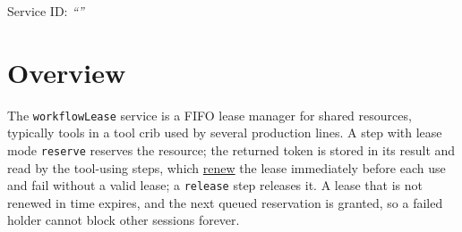 \documentclass[a4paper]{arrowhead}
\newcommand{\oref}[1]{{\textcolor{ArrowheadBlue}{\hyperref[sec:operations:#1]{#1}}}}
\begin{document}
\ArrowheadSetup

\begin{center}
  \vspace*{1cm}
  \huge{\arrowtitle}

  \vspace*{0.2cm}
  \LARGE{\arrowtype}
  \vspace*{1cm}

  \Large{Service ID: \textit{``\arrowid''}}
  \vspace*{\fill}

  

  \vspace*{1cm}
  \vspace*{\fill}

  \begin{abstract}
    This document describes the \texttt{workflowLease} service of the Eclipse Arrowhead workflow support systems, which grants exclusive, expiring use of shared resources such as tools. It is provided by the WorkflowManager system, service version 1.0.0, documentation edition 5.4.0.
  \end{abstract}

  \vspace*{1cm}
\end{center}

\newpage

\tableofcontents
\newpage

\section{Overview}
\label{sec:overview}
The \texttt{workflowLease} service is a FIFO lease manager for shared resources, typically tools
in a tool crib used by several production lines. A step with lease mode \texttt{reserve} reserves the resource; the
returned token is stored in its result and read by the tool-using steps, which \oref{renew} the lease immediately before
each use and fail without a valid lease; a \texttt{release} step releases it. A lease that is not renewed in time
expires, and the next queued reservation is granted, so a failed holder cannot block other sessions forever.
\end{document}
